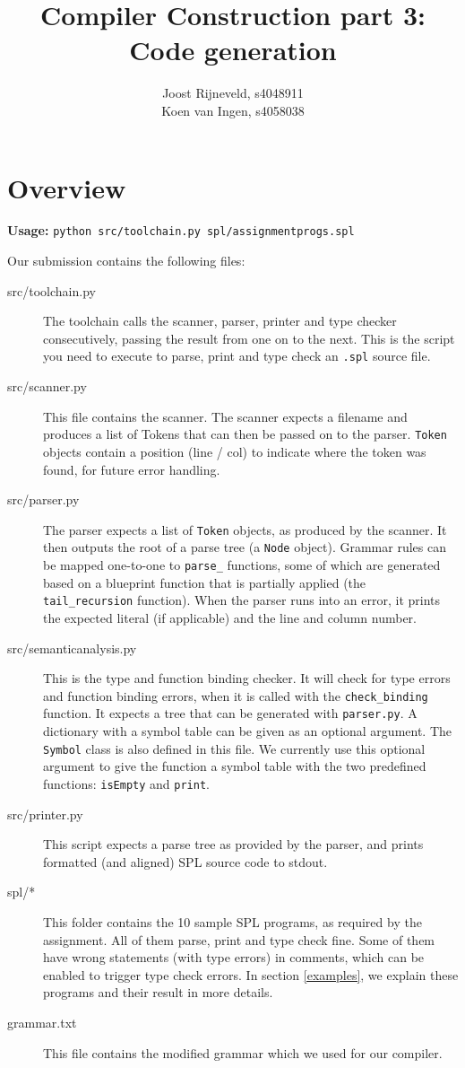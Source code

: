 \documentclass[a4paper]{article}
\title{Compiler Construction part 3: Code generation}
\author{Joost Rijneveld, s4048911\\Koen van Ingen, s4058038}
\date{}
\begin{document}
\maketitle

\section{Overview}
{\bf Usage:} {\tt python src/toolchain.py spl/assignmentprogs.spl}

Our submission contains the following files:

\begin{description}
	\item[src/toolchain.py] The toolchain calls the scanner, parser, printer and type checker consecutively, passing the result from one on to the next. This is the script you need to execute to parse, print and type check an {\tt .spl} source file.
	\item[src/scanner.py] This file contains the scanner. The scanner expects a filename and produces a list of Tokens that can then be passed on to the parser. {\tt Token} objects contain a position (line / col) to indicate where the token was found, for future error handling.
	\item[src/parser.py] The parser expects a list of {\tt Token} objects, as produced by the scanner. It then outputs the root of a parse tree (a {\tt Node} object). Grammar rules can be mapped one-to-one to {\tt parse\_} functions, some of which are generated based on a blueprint function that is partially applied (the {\tt tail\_recursion} function). When the parser runs into an error, it prints the expected literal (if applicable) and the line and column number.
	\item[src/semanticanalysis.py] This is the type and function binding checker. It will check for type errors and function binding errors, when it is called with the {\tt check\_binding} function. It expects a tree that can be generated with {\tt parser.py}. A dictionary with a symbol table can be given as an optional argument. The {\tt Symbol} class is also defined in this file. We currently use this optional argument to give the function a symbol table with the two predefined functions: {\tt isEmpty} and {\tt print}. 
	\item[src/printer.py] This script expects a parse tree as provided by the parser, and prints formatted (and aligned) SPL source code to stdout.
	\item[spl/*] This folder contains the 10 sample SPL programs, as required by the assignment. All of them parse, print and type check fine. Some of them have wrong statements (with type errors) in comments, which can be enabled to trigger type check errors. In section \ref{examples}, we explain these programs and their result in more details.
	\item[grammar.txt] This file contains the modified grammar which we used for our compiler.
\end{description}
\end{document}
